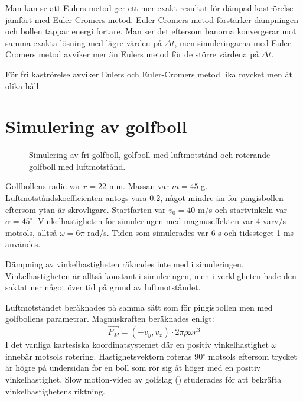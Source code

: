 \documentclass[12pt, a4paper]{article}
\begin{document}
Man kan se att Eulers metod ger ett mer exakt resultat för dämpad kaströrelse jämfört med Euler-Cromers metod. Euler-Cromers metod förstärker dämpn\-ingen och bollen tappar energi fortare. Man ser det eftersom banorna konvergerar mot samma exakta lösning med lägre värden på $\Delta t$, men simuleringarna med Euler-Cromers metod avviker mer än Eulers metod för de större värdena på $\Delta t$.

För fri kaströrelse avviker Eulers och Euler-Cromers metod lika mycket men åt olika håll.

\section{Simulering av golfboll}
\begin{figure}[ht]
    \centering
    \caption{Simulering av fri golfboll, golfboll med luftmotstånd och roterande golfboll med luftmotstånd.}
    
    \label{fig:golfboll}
\end{figure}
Golfbollens radie var $r=22$ mm. Massan var $m=45$ g. Luftmotstånds\-koefficienten antogs vara 0.2, något mindre än för pingisbollen eftersom ytan är skrovligare. Startfarten var $v_0=40$ m/s och startvinkeln var $\alpha=45^\circ$. Vinkelhastigheten för simuleringen med magnuseffekten var 4 varv/s motsols, alltså $\omega=6\pi$ rad/s. Tiden som simulerades var 6 s och tidssteget 1 ms användes.

Dämpning av vinkelhastigheten räknades inte med i simuleringen. Vinkelhastigheten är alltså konstant i simuleringen, men i verkligheten hade den saktat ner något över tid på grund av luftmotståndet.

Luftmotståndet beräknades på samma sätt som för pingisbollen men med golfbollens parametrar. Magnuskraften beräknades enligt: 
\begin{equation*}
    \vec{F_M}=(-v_y, v_x)\cdot2\pi\rho\omega r^3
\end{equation*}
I det vanliga kartesiska koordinatsystemet där en positiv vinkelhastighet $\omega$ innebär motsols rotering. Hastighetsvektorn roteras 90$^\circ$ motsols eftersom trycket är högre på undersidan för en boll som rör sig åt höger med en positiv vinkelhastighet. Slow motion-video av golfslag (\cite{SlowMotionGolf}) studerades för att bekräfta vinkelhastighetens riktning.
\end{document}
